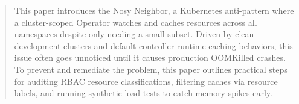 \begin{abstract}
	This paper introduces the Nosy Neighbor, a Kubernetes anti-pattern where a cluster-scoped Operator watches and caches resources across all namespaces despite only needing a small subset.
	Driven by clean development clusters and default controller-runtime caching behaviors, this issue often goes unnoticed until it causes production OOMKilled crashes.
	To prevent and remediate the problem, this paper outlines practical steps for auditing RBAC resource classifications, filtering caches via resource labels, and running synthetic load tests to catch memory spikes early.
\end{abstract}

